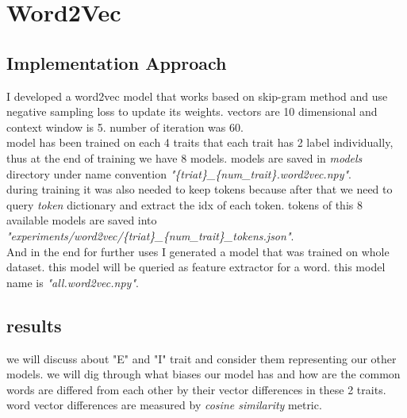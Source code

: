 \documentclass[10pt, a4paper]{article}
\begin{document}
\section{Word2Vec}
\subsection{Implementation Approach}
I developed a word2vec model that works based on skip-gram method and use negative sampling loss to update its weights. vectors are 10 dimensional and context window is 5. number of iteration was 60.
\\
model has been trained on each 4 traits that each trait has 2 label individually, thus at the end of training we have 8 models.
models are saved in \textit{models} directory under name convention \textit{"\{triat\}\_\{num\_trait\}.word2vec.npy"}.
\\
during training it was also needed
to keep tokens because after that we need to query \textit{token} dictionary and extract the idx of each token. tokens of this 8 available models are saved into \textit{"experiments/word2vec/\{triat\}\_\{num\_trait\}\_tokens.json"}.
\\
And in the end
for further uses I generated a model that was trained on whole dataset. this model will be queried as feature extractor for a word. this model name is \textit{"all.word2vec.npy"}.

\subsection{results}
we will discuss about "E" and "I" trait and consider them representing our other models. we will dig through what biases our model has and
how are the common words are differed from each other by their vector differences in these 2 traits. word vector differences are measured by \textit{cosine similarity} metric.
\\
\end{document}
